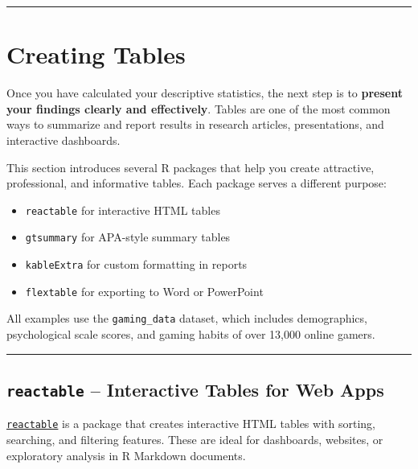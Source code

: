 \documentclass[
]{book}
\providecommand{\tightlist}{%
  \setlength{\itemsep}{0pt}\setlength{\parskip}{0pt}}
\begin{document}
\begin{center}\rule{0.5\linewidth}{0.5pt}\end{center}

\section*{Creating Tables}\label{creating-tables}

Once you have calculated your descriptive statistics, the next step is to \textbf{present your findings clearly and effectively}. Tables are one of the most common ways to summarize and report results in research articles, presentations, and interactive dashboards.

This section introduces several R packages that help you create attractive, professional, and informative tables. Each package serves a different purpose:

\begin{itemize}
\tightlist
\item
  \texttt{reactable} for interactive HTML tables
\item
  \texttt{gtsummary} for APA-style summary tables
\item
  \texttt{kableExtra} for custom formatting in reports
\item
  \texttt{flextable} for exporting to Word or PowerPoint
\end{itemize}

All examples use the \texttt{gaming\_data} dataset, which includes demographics, psychological scale scores, and gaming habits of over 13,000 online gamers.

\begin{center}\rule{0.5\linewidth}{0.5pt}\end{center}

\subsection*{\texorpdfstring{\texttt{reactable} -- Interactive Tables for Web Apps}{reactable -- Interactive Tables for Web Apps}}\label{reactable-interactive-tables-for-web-apps}

\href{https://glin.github.io/reactable/}{\texttt{reactable}} is a package that creates interactive HTML tables with sorting, searching, and filtering features. These are ideal for dashboards, websites, or exploratory analysis in R Markdown documents.
\end{document}
